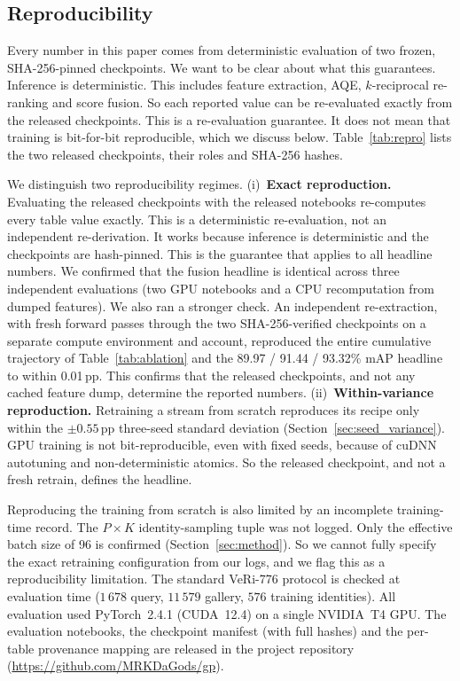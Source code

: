 \subsection{Reproducibility}
\label{sec:reproducibility}
Every number in this paper comes from deterministic evaluation of two frozen, SHA-256-pinned checkpoints. We want to be clear about what this guarantees. Inference is deterministic. This includes feature extraction, AQE, $k$-reciprocal re-ranking and score fusion. So each reported value can be re-evaluated exactly from the released checkpoints. This is a re-evaluation guarantee. It does not mean that training is bit-for-bit reproducible, which we discuss below. Table~\ref{tab:repro} lists the two released checkpoints, their roles and SHA-256 hashes.

We distinguish two reproducibility regimes. (i)~\textbf{Exact reproduction.} Evaluating the released checkpoints with the released notebooks re-computes every table value exactly. This is a deterministic re-evaluation, not an independent re-derivation. It works because inference is deterministic and the checkpoints are hash-pinned. This is the guarantee that applies to all headline numbers. We confirmed that the fusion headline is identical across three independent evaluations (two GPU notebooks and a CPU recomputation from dumped features). We also ran a stronger check. An independent re-extraction, with fresh forward passes through the two SHA-256-verified checkpoints on a separate compute environment and account, reproduced the entire cumulative trajectory of Table~\ref{tab:ablation} and the 89.97 / 91.44 / 93.32\% mAP headline to within 0.01\,pp. This confirms that the released checkpoints, and not any cached feature dump, determine the reported numbers. (ii)~\textbf{Within-variance reproduction.} Retraining a stream from scratch reproduces its recipe only within the $\pm0.55$\,pp three-seed standard deviation (Section~\ref{sec:seed_variance}). GPU training is not bit-reproducible, even with fixed seeds, because of cuDNN autotuning and non-deterministic atomics. So the released checkpoint, and not a fresh retrain, defines the headline.

Reproducing the training from scratch is also limited by an incomplete training-time record. The $P\times K$ identity-sampling tuple was not logged. Only the effective batch size of 96 is confirmed (Section~\ref{sec:method}). So we cannot fully specify the exact retraining configuration from our logs, and we flag this as a reproducibility limitation. The standard VeRi-776 protocol is checked at evaluation time ($1\,678$ query, $11\,579$ gallery, $576$ training identities). All evaluation used PyTorch~2.4.1 (CUDA~12.4) on a single NVIDIA~T4 GPU. The evaluation notebooks, the checkpoint manifest (with full hashes) and the per-table provenance mapping are released in the project repository (\url{https://github.com/MRKDaGods/gp}).
